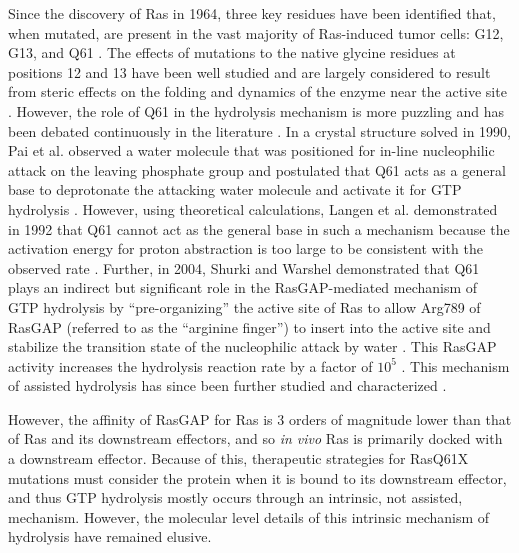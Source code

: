 Since the discovery of Ras in 1964\cite{Harvey1964}, three key residues have been identified that, when mutated, are present in the vast majority of Ras-induced tumor cells: G12, G13, and Q61 \cite{Prior2012}.
The effects of mutations to the native glycine residues at positions 12 and 13 have been well studied and are largely considered to result from steric effects on the folding and dynamics of the enzyme near the active site \cite{Prior2012, Bos1989, Eccleston1993, Hobbs2016}.
However, the role of Q61 in the hydrolysis mechanism is more puzzling and has been debated continuously in the literature \cite{Kamerlin2013, Carvalho2015}.
In a crystal structure solved in 1990, Pai et al. observed a water molecule that was positioned for in-line nucleophilic attack on the leaving phosphate group and postulated that Q61 acts as a general base to deprotonate the attacking water molecule and activate it for GTP hydrolysis \cite{Pai1990}. 
However, using theoretical calculations, Langen et al. demonstrated in 1992 that Q61 cannot act as the general base in such a mechanism because the activation energy for proton abstraction is too large to be consistent with the observed rate \cite{Langen1992}.
Further, in 2004, Shurki and Warshel\cite{Shurki2004} demonstrated that Q61 plays an indirect but significant role in the RasGAP-mediated mechanism of GTP hydrolysis by ``pre-organizing'' the active site of Ras to allow Arg789 of RasGAP (referred to as the ``arginine finger'') to insert into the active site and stabilize the transition state of the nucleophilic attack by water \cite{Scheffzek1997}. 
This RasGAP activity increases the hydrolysis reaction rate by a factor of $10^5$ \cite{Schweins1995}.
This mechanism of assisted hydrolysis has since been further studied and characterized \cite{Khrenova2015, Shurki2004, Grigorenko2005}.

However, the affinity of RasGAP for Ras is 3 orders of magnitude lower than that of Ras and its downstream effectors\cite{Vogel1988}, and so \emph{in vivo} Ras is primarily docked with a downstream effector. 
Because of this, therapeutic strategies for RasQ61X mutations must consider the protein when it is bound to its downstream effector, and thus GTP hydrolysis mostly occurs through an intrinsic, not assisted, mechanism. 
However, the molecular level details of this intrinsic mechanism of hydrolysis have remained elusive.

